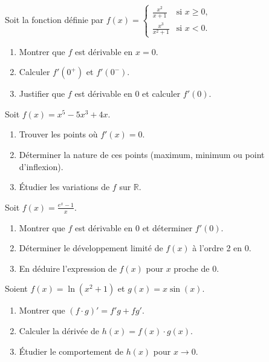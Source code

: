 \begin{exercice}
Soit la fonction définie par \( f(x) = \begin{cases}
  \frac{x^2}{x+1} & \text{si } x \geq 0, \\
  \frac{x^3}{x^2+1} & \text{si } x < 0.
\end{cases} \)
\begin{enumerate}
    \item Montrer que \( f \) est dérivable en \( x = 0 \).
    \item Calculer \( f'(0^+) \) et \( f'(0^-) \). 
    \item Justifier que \( f \) est dérivable en \( 0 \) et calculer \( f'(0) \).
\end{enumerate}
\end{exercice}

\begin{exercice}
Soit \( f(x) = x^5 - 5x^3 + 4x \).
\begin{enumerate}
    \item Trouver les points où \( f'(x) = 0 \).
    \item Déterminer la nature de ces points (maximum, minimum ou point d'inflexion).
    \item Étudier les variations de \( f \) sur \( \mathbb{R} \).
\end{enumerate}
\end{exercice}

\begin{exercice}
Soit \( f(x) = \frac{e^x - 1}{x} \).
\begin{enumerate}
    \item Montrer que \( f \) est dérivable en \( 0 \) et déterminer \( f'(0) \).
    \item Déterminer le développement limité de \( f(x) \) à l'ordre 2 en \( 0 \).
    \item En déduire l'expression de \( f(x) \) pour \( x \) proche de \( 0 \).
\end{enumerate}
\end{exercice}

\begin{exercice}
Soient \( f(x) = \ln(x^2 + 1) \) et \( g(x) = x \sin(x) \).
\begin{enumerate}
    \item Montrer que \( (f \cdot g)' = f' g + f g' \).
    \item Calculer la dérivée de \( h(x) = f(x) \cdot g(x) \).
    \item Étudier le comportement de \( h(x) \) pour \( x \to 0 \).
\end{enumerate}
\end{exercice}

